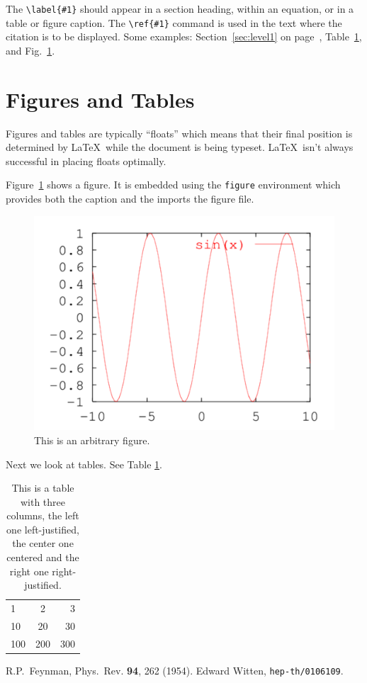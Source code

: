 \documentclass[aps,12pt]{revtex4}
\begin{document}
The \verb+\label{#1}+ should appear in a section heading, within an
equation, or in a table or figure caption. The \verb+\ref{#1}+ command
is used in the text where the citation is to be displayed.  Some
examples: Section~\ref{sec:level1} on page~\pageref{sec:level1},
Table~\ref{tab:table1}, and Fig.~\ref{fig:arb}.

\section{Figures and Tables}

Figures and tables are typically ``floats'' which means that their
final position is determined by \LaTeX\ while the document is being
typeset. \LaTeX\ isn't always successful in placing floats
optimally.

Figure~\ref{fig:arb} shows a figure. It is embedded using the
\texttt{figure} environment which provides both the caption and the
imports the figure file.

\begin{figure}[h]
\centerline{
\includegraphics[width=4.5in]{sine.pdf}
}
\caption{This is an arbitrary figure.}\label{fig:arb}
\end{figure}

Next we look at tables.  See Table \ref{tab:table1}.

\begin{table}[h]
\caption{\label{tab:table1} This is a table with three columns, the
left one left-justified, the center one centered and the right one
right-justified.}
\begin{ruledtabular}
\begin{tabular}{lcr}
\hline
1 & 2 & 3\\
10 & 20 & 30\\
100 & 200 & 300\\
\end{tabular}
\end{ruledtabular}
\end{table}

\begin{thebibliography}{99}
  R.P.~Feynman, Phys.\ Rev. {\bf 94}, 262 (1954).
  Edward Witten, {\tt hep-th/0106109}.
\end{thebibliography}
\end{document}
